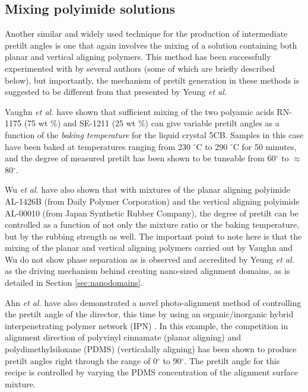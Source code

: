 \subsection{Mixing polyimide solutions}
Another similar and widely used technique for the production of intermediate pretilt angles is one that again involves the mixing of a solution containing both planar and vertical aligning polymers. This method has been successfully experimented with by several authors \cite{Yeung2006a,Vaughn2007,Wu2008,Ahn2009,Lee2009,Kang2009} (some of which are briefly described below), but importantly, the mechanism of pretilt generation in these methods is suggested to be different from that presented by Yeung \textit{et al.}

Vaughn \textit{et al.} \cite{Vaughn2007} have shown that sufficient mixing of the two polyamic acids RN-1175 (75 wt \%) and SE-1211 (25 wt \%) can give variable pretilt angles as a function of the \textit{baking temperature} for the liquid crystal 5CB. Samples in this case have been baked at temperatures ranging from 230 $^{\circ}$C to 290 $^{\circ}$C for 50 minutes, and the degree of measured pretilt has been shown to be tuneable from 60$^{\circ}$ to $\approx$80$^{\circ}$.

Wu \textit{et al.} \cite{Wu2008} have also shown that with mixtures of the planar aligning polyimide AL-1426B (from Daily Polymer Corporation) and the vertical aligning polyimide AL-00010 (from Japan Synthetic Rubber Company), the degree of pretilt can be controlled as a function of not only the mixture ratio or the baking temperature, but by the rubbing strength as well. The important point to note here is that the mixing of the planar and vertical aligning polymers carried out by Vaughn \cite{Vaughn2007} and Wu \cite{Wu2008} do not show phase separation as is observed and accredited by Yeung \textit{et al.} as the driving mechanism behind creating nano-sized alignment domains, as is detailed in Section \ref{sec:nanodomains}.

Ahn \textit{et al.} have also demonstrated a novel photo-alignment method of controlling the pretilt angle of the director, this time by using an organic/inorganic hybrid interpenetrating polymer network (IPN) \cite{Ahn2009}. In this example, the competition in alignment direction of polyvinyl cinnamate (planar aligning) and polydimethylsiloxane (PDMS) (verticalally aligning) has been shown to produce pretilt angles right through the range of 0$^{\circ}$ to 90$^{\circ}$. The pretilt angle for this recipe is controlled by varying the PDMS concentration of the alignment surface mixture.

